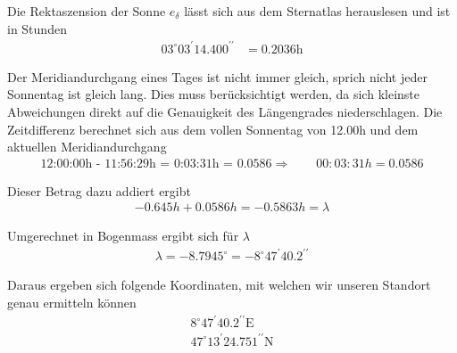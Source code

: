 \begin{refsection}
Die Rektaszension der Sonne $e_\delta$ lässt sich aus dem Sternatlas herauslesen und ist in Stunden
\begin{align*}
03^{\circ} 03^{\prime} 14.400^{\prime \prime} &= 0.2036 \text{h}
\end{align*}

Der Meridiandurchgang eines Tages ist nicht immer gleich, sprich nicht jeder Sonnentag ist gleich lang. Dies muss berücksichtigt werden, da sich kleinste Abweichungen direkt auf die Genauigkeit des Längengrades niederschlagen.
Die Zeitdifferenz berechnet sich aus dem vollen Sonnentag von 12.00h und dem aktuellen Meridiandurchgang
\begin{align*}
\text{12:00:00h - 11:56:29h = 0:03:31h = 0.0586}
\Rightarrow \quad \quad
00:03:31h = 0.0586
\end{align*}






Dieser Betrag dazu addiert ergibt
\begin{align*}
-0.645 h + 0.0586 h = - 0.5863 h = \lambda
\end{align*}

Umgerechnet in Bogenmass ergibt sich für $\lambda$
\begin{align*}
\lambda = - 8.7945^{\circ} = -8^{\circ} 47^{\prime} 40.2^{\prime \prime}
\end{align*}



Daraus ergeben sich folgende Koordinaten, mit welchen wir unseren Standort genau ermitteln können
\begin{align*}
8^{\circ}  47^{\prime}  40.2^{\prime \prime} \text{E} \\
47^{\circ}  13^{\prime}  24.751^{\prime \prime} \text{N}
\end{align*}




\printbibliography[heading=subbibliography]
\end{refsection}







